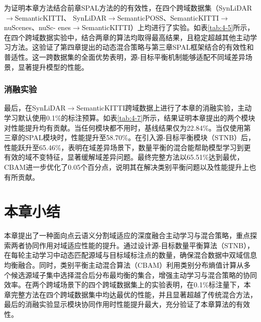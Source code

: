     为证明本章方法结合前章SPAL方法的的有效性，在四个跨域数据集（SynLiDAR$\to$SemanticKITTI、
    SynLiDAR$\to$SemanticPOSS、SemanticKITTI$\to$nuScenes、nuSc-
    enes$\to$SemanticKITTI）上均进行了实验。如表\ref{tab:4-5}所示，在四个跨域数据实验中，结合两章的算法均取得最高结果，且稳定超越其他主动学习方法。这验证了第四章提出的动态混合策略与第三章SPAL框架结合的有效性和普适性。这一跨数据集的全面优势表明，源-目标平衡机制能够适配不同域差异场景，显著提升模型的性能。
    
    \subsubsection{消融实验}
    最后，在SynLiDAR$\to$SemanticKITTI跨域数据上进行了本章的消融实验，主动学习默认使用0.1\%的标注预算。如表\ref{tab:4-7}所示，结果证明本章提出的两个模块对性能提升均有贡献。当任何模块都不用时，基线结果仅为22.84\%。当仅使用第三章的SPAL模块时，性能提升至58.70\%。在引入源-目标平衡模块（STNB）后，性能跃升至65.46\%，表明在域差异场景下，数量平衡的混合能帮助模型学习到更有效的域不变特征，显著缓解域差异问题。最终完整方法以65.51\%达到最优，CBAM进一步优化了0.05个百分点，说明其在解决类别平衡问题以及性能提升上也有所贡献。
    
    
    \section{本章小结}
    本章提出了一种面向点云语义分割域适应的深度融合主动学习与混合策略，重点探索两者协同作用对域适应性能的提升。通过设计源-目标数量平衡算法（STNB），在每轮主动学习中动态匹配源域与目标域标注点的数量，确保混合数据中双域信息均衡融合。同时，类别平衡主动混合算法（CBAM）利用类别分布熵值计算从多个候选源域子集中选择混合后分布最均衡的集合，增强主动学习与混合策略的协同效率。在两个跨域场景下的四个跨域数据集上的实验表明，在0.1\%标注量下，本章完整方法在四个跨域数据集中均达最优的性能，并且显著超越了传统混合方法，最后的消融实验显示模块协同作用时性能提升最大，充分验证了本章算法的有效性。
